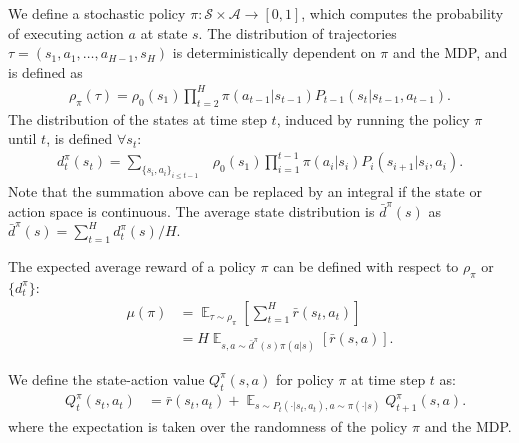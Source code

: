\documentclass{article}
\begin{document}
We define a stochastic policy $\pi: \mathcal{S}\times\mathcal{A}\to [0,1]$, which computes the probability of executing action $a$ at state $s$. The distribution of trajectories $\tau = (s_1, a_1, \hdots,a_{H-1}, s_H)$ is deterministically dependent on $\pi$ and the MDP, and is defined as
\begin{align}
\rho_{\pi}(\tau) = \rho_0(s_1) \prod_{t=2}^{H} \pi(a_{t-1}|s_{t-1})P_{t-1}(s_t|s_{t-1}, a_{t-1}).\nonumber
\end{align}
%
%
The distribution of the states at time step $t$, induced by running the policy $\pi$ until $t$, is defined  $\forall s_t$:
\begin{align}
d_t^{\pi}(s_{t}) = \sum_{\{s_i,a_i\}_{i\leq t-1}} &\rho_{0}(s_1)\prod_{i=1}^{t-1}\pi(a_i|s_i)P_{i}(s_{i+1}|s_{i},a_{i}). \nonumber
\end{align} Note that the summation above can be replaced by an integral if the state or action space is continuous. The average state distribution is $\bar{d}^{\pi}(s)$ as $\bar{d}^{\pi}(s) = \sum_{t=1}^H d_t^{\pi}(s) / H$.



The expected average reward of a policy $\pi$ can be defined with respect to $\rho_{\pi}$ or $\{d_t^{\pi}\}$:
\begin{align}
\mu(\pi) &= \mathop{\mathbb{E}}_{\tau\sim \rho_{\pi}}[\sum_{t=1}^H \bar{r}(s_t,a_t)] \nonumber \\
&= H\mathop{\mathbb{E}}_{s,a\sim \bar{d}^{\pi}(s)\pi(a|s)}[\bar{r}(s,a)].\nonumber
\end{align}


We define the state-action value $Q_t^{\pi}(s,a)$ for policy $\pi$ at time step $t$ as:
\begin{align}
&Q_t^{\pi}(s_t,a_t) %
&=\bar{r}(s_t,a_t) + \mathop{\mathbb{E}}_{s\sim P_t(\cdot|s_t,a_t),a\sim\pi(\cdot|s)}Q^\pi_{t+1}(s,a). \nonumber
\end{align} where the expectation is taken over the randomness of the policy $\pi$ and the MDP. 
\end{document}
